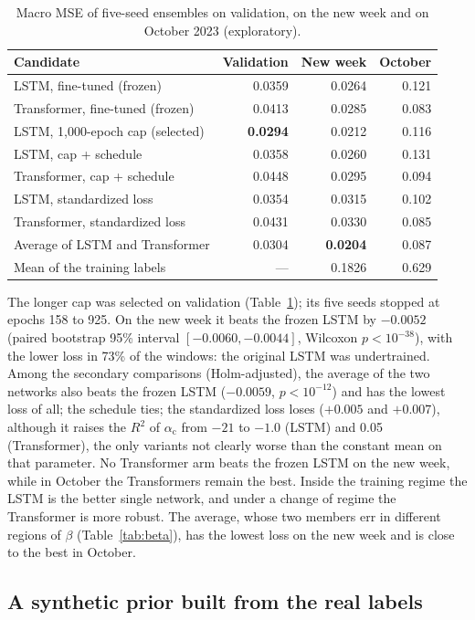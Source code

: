 \documentclass[preprint,12pt,authoryear]{elsarticle}
\newcommand{\across}{\alpha_{\mathrm{c}}}
\begin{document}
\begin{table}[t]
\centering
\caption{Macro MSE of five-seed ensembles on validation, on the new week and on October 2023
(exploratory).}
\label{tab:recipe}
\small
\begin{tabular}{lrrr}
\toprule
Candidate & Validation & New week & October\\
\midrule
LSTM, fine-tuned (frozen) & 0.0359 & 0.0264 & 0.121\\
Transformer, fine-tuned (frozen) & 0.0413 & 0.0285 & 0.083\\
LSTM, 1,000-epoch cap (selected) & \textbf{0.0294} & 0.0212 & 0.116\\
LSTM, cap + schedule & 0.0358 & 0.0260 & 0.131\\
Transformer, cap + schedule & 0.0448 & 0.0295 & 0.094\\
LSTM, standardized loss & 0.0354 & 0.0315 & 0.102\\
Transformer, standardized loss & 0.0431 & 0.0330 & 0.085\\
Average of LSTM and Transformer & 0.0304 & \textbf{0.0204} & 0.087\\
Mean of the training labels & --- & 0.1826 & 0.629\\
\bottomrule
\end{tabular}
\end{table}

The longer cap was selected on validation (Table~\ref{tab:recipe}); its five seeds stopped at
epochs 158 to 925. On the new week it beats the frozen LSTM by $-0.0052$ (paired bootstrap
95\% interval $[-0.0060,-0.0044]$, Wilcoxon $p<10^{-38}$), with the lower loss in 73\% of the
windows: the original LSTM was undertrained. Among the secondary comparisons (Holm-adjusted),
the average of the two networks also beats the frozen LSTM ($-0.0059$, $p<10^{-12}$) and has
the lowest loss of all; the schedule ties; the standardized loss loses ($+0.005$ and $+0.007$),
although it raises the $R^2$ of $\across$ from $-21$ to $-1.0$ (LSTM) and 0.05 (Transformer),
the only variants not clearly worse than the constant mean on that parameter. No Transformer
arm beats the frozen LSTM on the new week, while in October the Transformers remain the best.
Inside the training regime the LSTM is the better single network, and under a change of regime
the Transformer is more robust. The average, whose two members err in different regions of
$\beta$ (Table~\ref{tab:beta}), has the lowest loss on the new week and is close to the best in
October.

\subsection{A synthetic prior built from the real labels}
\label{sec:scope-b}
\end{document}
